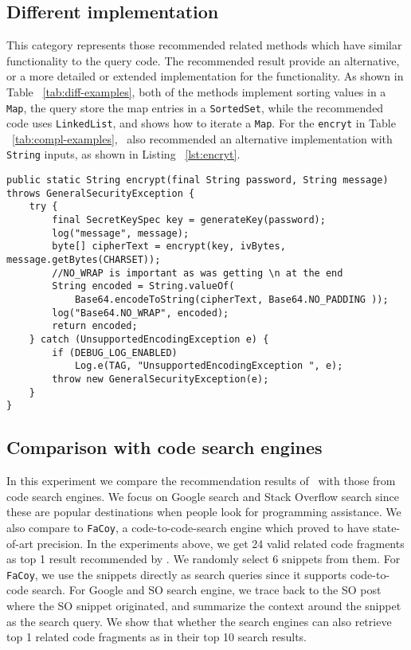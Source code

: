 \subsection{Different implementation} This category represents those recommended related methods which have similar functionality to the query code. The recommended result provide an alternative, or a more detailed or extended implementation for the functionality. As shown in Table ~\ref{tab:diff-examples}, both of the methods implement sorting values in a \texttt{Map}, the query store the map entries in a \texttt{SortedSet}, while the recommended code uses \texttt{LinkedList}, and shows how to iterate a \texttt{Map}. For the \texttt{encryt} in Table ~\ref{tab:compl-examples}, \tool\ also recommended an alternative implementation with \texttt{String} inputs, as shown in Listing ~\ref{lst:encryt}.


\begin{lstlisting}[caption={different implementation for \texttt{encrypt}}, label={lst:encryt}]
public static String encrypt(final String password, String message) throws GeneralSecurityException {
	try {
		final SecretKeySpec key = generateKey(password);
		log("message", message);
		byte[] cipherText = encrypt(key, ivBytes, message.getBytes(CHARSET));
		//NO_WRAP is important as was getting \n at the end
		String encoded = String.valueOf(
			Base64.encodeToString(cipherText, Base64.NO_PADDING ));
		log("Base64.NO_WRAP", encoded);
		return encoded;
	} catch (UnsupportedEncodingException e) {
		if (DEBUG_LOG_ENABLED)
			Log.e(TAG, "UnsupportedEncodingException ", e);
		throw new GeneralSecurityException(e);
	}
}
\end{lstlisting}



\subsection{Comparison with code search engines}
In this experiment we compare the recommendation results of \tool\ with those from code search engines. We focus on Google search and Stack Overflow search since these are popular destinations when people look for programming assistance. We also compare to \texttt{FaCoy}, a code-to-code-search engine which proved to have state-of-art precision. In the experiments above, we get 24 valid related code fragments as top 1 result recommended by \tool. We randomly select 6 snippets from them. For \texttt{FaCoy}, we use the snippets directly as search queries since it supports code-to-code search. For Google and SO search engine, we trace back to the SO post where the SO snippet originated, and summarize the context around the snippet as the search query. We show that whether the search engines can also retrieve top 1 related code fragments as \tool in their top 10 search results. 


